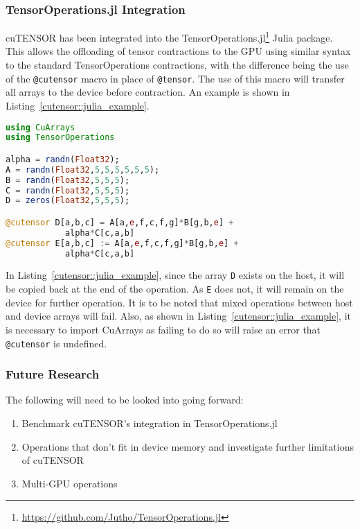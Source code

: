 \subsubsection{TensorOperations.jl Integration} \label{cutensor::julia}
cuTENSOR has been integrated into the TensorOperations.jl\footnote{\url{https://github.com/Jutho/TensorOperations.jl}} Julia package. This allows the offloading of tensor contractions to the GPU using similar syntax to the standard TensorOperations contractions, with the difference being the use of the \texttt{@cutensor} macro in place of \texttt{@tensor}. The use of this macro will transfer all arrays to the device before contraction. An example is shown in Listing~\ref{cutensor::julia_example}.

\begin{lstlisting}[language=Julia, label=cutensor::julia_example, caption=cuTENSOR contraction in Julia]
using CuArrays
using TensorOperations

alpha = randn(Float32);
A = randn(Float32,5,5,5,5,5,5);
B = randn(Float32,5,5,5);
C = randn(Float32,5,5,5);
D = zeros(Float32,5,5,5);

@cutensor D[a,b,c] = A[a,e,f,c,f,g]*B[g,b,e] +
			alpha*C[c,a,b]
@cutensor E[a,b,c] := A[a,e,f,c,f,g]*B[g,b,e] +
			alpha*C[c,a,b]
\end{lstlisting}

\noindent In Listing~\ref{cutensor::julia_example}, since the array \texttt{D} exists on the host, it will be copied back at the end of the operation. As \texttt{E} does not, it will remain on the device for further operation. It is to be noted that mixed operations between host and device arrays will fail. Also, as shown in Listing~\ref{cutensor::julia_example}, it is necessary to import CuArrays as failing to do so will raise an error that \texttt{@cutensor} is undefined.

\subsubsection{Future Research} \label{cutensor::futurework}
The following will need to be looked into going forward:

\begin{enumerate}
\item Benchmark cuTENSOR's integration in TensorOperations.jl
\item Operations that don't fit in device memory and investigate further limitations of cuTENSOR
\item Multi-GPU operations
\end{enumerate}

